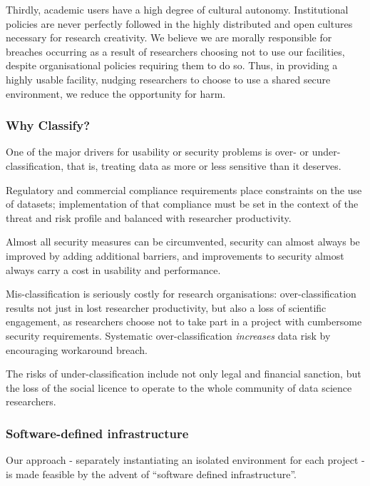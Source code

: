 \documentclass[10pt,a4paper,twocolumn]{article}
\begin{document}
Thirdly, academic users have a high degree of cultural autonomy. Institutional policies are never
perfectly followed in the highly distributed and open cultures necessary for research creativity. We believe we are morally responsible for breaches occurring as a result of researchers choosing not to use our facilities, despite organisational policies requiring them to do so. 
Thus, in providing a highly usable facility, nudging researchers to choose to use a shared secure environment, we reduce the opportunity for harm.

\subsubsection{Why Classify?}

One of the major drivers for usability or security problems is over- or under-classification, that is, treating data as more or less sensitive than it deserves.

Regulatory and commercial compliance requirements place constraints on the use of datasets; implementation of that compliance must be set in the context of the threat and risk profile and balanced with researcher productivity.

Almost all security measures can be circumvented, security can almost always be improved by adding additional barriers, and improvements
to security almost always carry a cost in usability and performance.

Mis-classification is seriously costly for research organisations: over-classification results not just in lost researcher productivity, but also a loss of scientific engagement, as researchers choose not to take part in a project with cumbersome security requirements. Systematic over-classification \emph{increases} data risk by encouraging workaround breach.

The risks of under-classification include not only
legal and financial sanction, but the loss of the social licence to operate to the whole community of data science researchers\cite{carter2015social}.


\subsubsection{Software-defined infrastructure}

Our approach - separately instantiating an isolated environment for each project - is made feasible by the advent of ``software defined infrastructure''.
\end{document}
